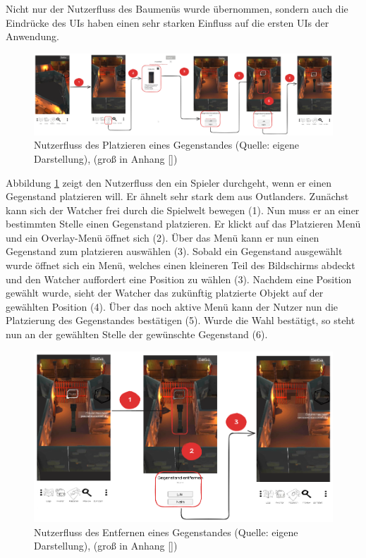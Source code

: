 Nicht nur der Nutzerfluss des Baumenüs wurde übernommen, sondern auch die Eindrücke des \ac{UI}s haben einen sehr starken Einfluss auf die ersten \ac{UI}s der Anwendung.

\begin{figure}[ht]
\centering
\includegraphics[width=1\linewidth]{content/pictures/PlacementFlow.png}
\caption{Nutzerfluss des Platzieren eines Gegenstandes (Quelle: eigene Darstellung), (groß in Anhang \ref{})}
\label{fig:userflow-placement-cm}
\end{figure}

Abbildung \ref{fig:userflow-placement-cm} zeigt den Nutzerfluss den ein Spieler durchgeht, wenn er einen Gegenstand platzieren will. Er ähnelt sehr stark dem aus Outlanders. Zunächst kann sich der Watcher frei durch die Spielwelt bewegen (1). Nun muss er an einer bestimmten Stelle einen Gegenstand platzieren. Er klickt auf das Platzieren Menü und ein Overlay-Menü öffnet sich (2). Über das Menü kann er nun einen Gegenstand zum platzieren auswählen (3). Sobald ein Gegenstand ausgewählt wurde öffnet sich ein Menü, welches einen kleineren Teil des Bildschirms abdeckt und den Watcher auffordert eine Position zu wählen (3). Nachdem eine Position gewählt wurde, sieht der Watcher das zukünftig platzierte Objekt auf der gewählten Position (4). Über das noch aktive Menü kann der Nutzer nun die Platzierung des Gegenstandes bestätigen (5). Wurde die Wahl bestätigt, so steht nun an der gewählten Stelle der gewünschte Gegenstand (6). 

\begin{figure}[ht]
\centering
\includegraphics[width=1\linewidth]{content/pictures/RemovePlacementFlow.png}
\caption{Nutzerfluss des Entfernen eines Gegenstandes (Quelle: eigene Darstellung), (groß in Anhang \ref{})}
\label{fig:userflow-removement-cm}
\end{figure}

